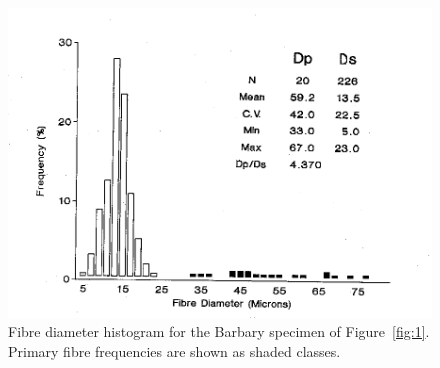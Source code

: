 %

\begin{figure}[h]
  \centering
  \includegraphics[width=\textwidth,trim = 0 0 0 120]{images/fig2.png}
  \caption{Fibre diameter histogram for the Barbary specimen of 
	   Figure~\ref{fig:1}.
	   Primary fibre frequencies are shown as shaded classes.}
  \label{fig:2}
\end{figure}

%
